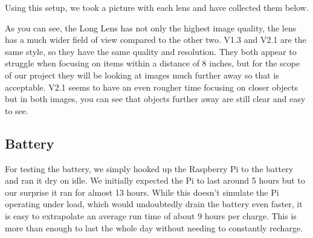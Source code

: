 \documentclass[letterpaper,12pt]{article}
\begin{document}
\medskip

Using this setup, we took a picture with each lens and have collected them below.\par




\medskip

As you can see, the Long Lens has not only the highest image quality, the lens has a much wider field of view compared to the other two. V1.3 and V2.1 are the same style, so they have the same quality and resolution. They both appear to struggle when focusing on items within a distance of 8 inches, but for the scope of our project they will be looking at images much further away so that is acceptable. V2.1 seems to have an even rougher time focusing on closer objects but in both images, you can see that objects further away are still clear and easy to see.\par

\subsection{Battery}


\medskip

For testing the battery, we simply hooked up the Raspberry Pi to the battery and ran it dry on idle. We initially expected the Pi to last around 5 hours but to our surprise it ran for almost 13 hours. While this doesn't simulate the Pi operating under load, which would undoubtedly drain the battery even faster, it is easy to extrapolate an average run time of about 9 hours per charge. This is more than enough to last the whole day without needing to constantly recharge.\par
\end{document}
